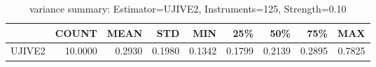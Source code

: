 \begin{table}[ht]
\centering
\caption{variance summary: Estimator=UJIVE2, Instruments=125, Strength=0.10}
\begin{tabular}{lrrrrrrrr}
\toprule
 & COUNT & MEAN & STD & MIN & 25\% & 50\% & 75\% & MAX \\
\midrule
UJIVE2 & 10.0000 & 0.2930 & 0.1980 & 0.1342 & 0.1799 & 0.2139 & 0.2895 & 0.7825 \\
\bottomrule
\end{tabular}
\end{table}
